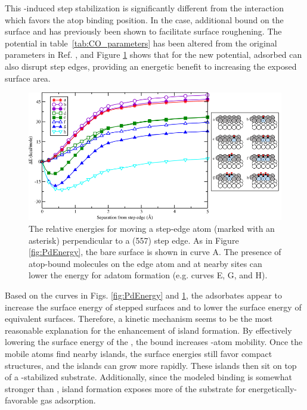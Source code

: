 This -induced step stabilization is significantly different
from the  interaction which favors the atop binding
position. In the  case, additional bound  on
the surface and has previously been shown to facilitate surface
roughening.\citep{Michalka:2013aa} The  potential in
table~\ref{tab:CO_parameters} has been altered from the original
parameters in Ref. \citep{Michalka:2013aa}, and Figure
\ref{fig:PtEnergy} shows that for the new potential, adsorbed 
can also disrupt step edges, providing an energetic benefit to
increasing the exposed  surface area.

\begin{landscape}
\begin{figure}[p!]
  \centering
  \includegraphics[width=0.85\linewidth]{../figures/chap3/PtEnergy_CO.pdf}
  \caption{The relative energies for moving a step-edge  atom
    (marked with an asterisk) perpendicular to a (557) step edge.  As in
    Figure \ref{fig:PdEnergy}, the bare surface is shown in curve A.
    The presence of atop-bound  molecules on the edge atom and
    at nearby sites can lower the energy for adatom formation
    (e.g. curves E, G, and H).} \label{fig:PtEnergy}
\end{figure}
\end{landscape}

Based on the curves in Figs. \ref{fig:PdEnergy} and
\ref{fig:PtEnergy}, the  adsorbates appear to increase the
surface energy of stepped  surfaces and to lower the surface
energy of equivalent  surfaces.  Therefore, a kinetic mechanism
seems to be the most reasonable explanation for the enhancement of island
formation.  By effectively lowering the surface energy of the ,
the bound  increases -atom mobility.  Once the mobile
 atoms find nearby islands, the surface energies still favor
compact structures, and the islands can grow more rapidly. These
islands then sit on top of a -stabilized  substrate.
Additionally, since the modeled  binding is somewhat
stronger than , island formation exposes more of the
 substrate for energetically-favorable gas adsorption.

